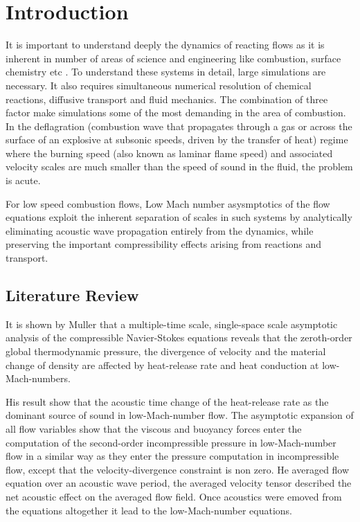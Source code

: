 \chapter{Introduction}

It is important to understand deeply the dynamics of reacting flows as it is inherent in number of areas of science and engineering like combustion, surface chemistry etc . To understand these systems in detail, large simulations are necessary. It also requires simultaneous numerical resolution of chemical reactions, diffusive
transport and fluid mechanics. The combination of three factor make simulations some of the most demanding in the area of combustion. In the deflagration (combustion wave that propagates through a gas or across the surface of an explosive at subsonic speeds, driven by the transfer of heat) regime where the burning speed (also known as laminar flame speed) and associated velocity scales are much smaller than the speed of sound in the fluid, the problem is acute.

\bigskip
\noindent For low speed combustion flows, Low Mach number asysmptotics of the flow equations exploit the inherent separation of scales in such systems by analytically eliminating acoustic wave propagation entirely from the dynamics, while preserving the important compressibility effects arising from reactions and transport.
\section{Literature Review}
It is shown by Muller that a multiple-time scale, single-space scale asymptotic analysis of the compressible Navier-Stokes equations reveals that the zeroth-order global thermodynamic pressure, the divergence of velocity and the material change of density are affected by heat-release rate and heat conduction at low-Mach-numbers.

\bigskip 
\noindent His result show that the acoustic time change of the heat-release rate as the dominant source of sound in low-Mach-number flow. The asymptotic expansion of all flow variables show that the viscous and buoyancy forces enter the computation of the second-order incompressible pressure in low-Mach-number flow in a similar way as they enter the pressure computation in incompressible flow, except that the
velocity-divergence constraint is non zero. He averaged flow equation over an acoustic wave period, the averaged velocity tensor described the net acoustic effect on the averaged flow field. Once acoustics were emoved from the equations altogether it lead to the low-Mach-number equations.

